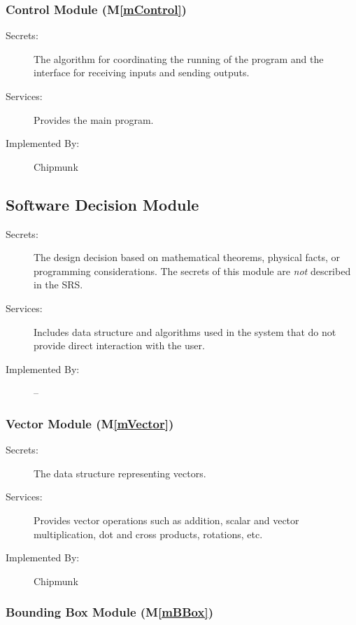 \documentclass[12pt]{article}
\newcommand{\mref}[1]{M\ref{#1}}
\begin{document}
\subsubsection{Control Module (\mref{mControl})}

\begin{description}
\item[Secrets:] The algorithm for coordinating the running of the program and the interface for receiving inputs and sending outputs.
\item[Services:] Provides the main program.
\item[Implemented By:] Chipmunk
\end{description}

\subsection{Software Decision Module}

\begin{description}
\item[Secrets:] The design decision based on mathematical theorems, physical
  facts, or programming considerations. The secrets of this module are
  \emph{not} described in the SRS.
\item[Services:] Includes data structure and algorithms used in the system that do not provide direct interaction with the user. 
\item[Implemented By:] --
\end{description}

\subsubsection{Vector Module (\mref{mVector})}
	
\begin{description}
	\item[Secrets:] The data structure representing vectors.
	\item[Services:] Provides vector operations such as addition, scalar and vector multiplication, dot and cross products, rotations, etc.
	\item[Implemented By:] Chipmunk
\end{description}

\subsubsection{Bounding Box Module (\mref{mBBox})}
\end{document}
